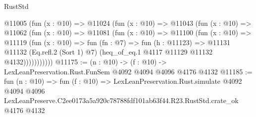 \begin{lexlean}{RustStd}
\begin{coremodule}
        @11005
          (fun (x : @10) =>
          @11024
            (fun (x : @10) =>
            @11043
              (fun (x : @10) =>
              @11062
                (fun (x : @10) =>
                @11081
                  (fun (x : @10) =>
                  @11100
                    (fun (x : @10) =>
                    @11119
                      (fun (x : @10) =>
                      fun (fn : @7) =>
                      fun (h : @11123) =>
                      @11131
                        @11132
                        (Eq.refl.{2} (Sort 1) @7)
                        (heq_of_eq.{1} @4117 @11129 @11132 @4132)))))))))))
@11175 := (n : @10) -> (f : @10) -> LexLeanPreservation.Rust.FunSem @4092 @4094 @4096 @4176 @4132
@11185 := fun (n : @10) =>
  fun (f : @10) =>
  LexLeanPreservation.Rust.simulate
    @4092
    @4094
    @4096
    LexLeanPreserve.C2ee0173a5a920c78788fdf101ab63f44.R23.RustStd.crate_ok
    @4176
    @4132
\end{coremodule}
\end{lexlean}
